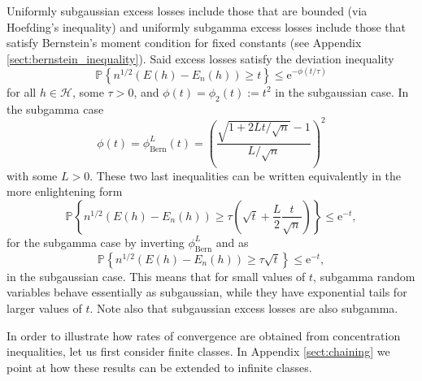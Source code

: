 \documentclass{uvamath}
\newcommand*{\calH}{\mathcal{H}}
\newcommand*{\prob}[2][]{\mathbb{P}_{#1}\left\{#2\right\}}
\newcommand*{\paren}[1]{\left(#1\right)}
\newcommand*{\rme}{\mathrm{e}}
\theoremstyle{remark}
\theoremstyle{definition}
\theoremstyle{definition}
\theoremstyle{definition}
\theoremstyle{definition}
\theoremstyle{definition}
\begin{document}
Uniformly subgaussian excess losses include those that are bounded
(via Hoefding's inequality) and uniformly subgamma excess losses
include those that satisfy Bernstein's moment condition for fixed
constants (see Appendix \ref{sect:bernstein_inequality}). Said excess
losses satisfy the deviation inequality
\begin{equation}\label{eq:pac_considered}
  \prob{n^{1/2}(E(h) - E_n(h))\geq t}\leq \rme^{-\phi(t/\tau)}
\end{equation}
for all $h\in\calH$, some $\tau>0$, and $\phi(t) = \phi_2(t):= t^2$ in
the subgaussian case. In the subgamma case
$$\phi(t)= \phi_{\text{Bern}}^L(t) = \paren{\frac{\sqrt{1 +
      2Lt/\sqrt{n}} - 1}{L/\sqrt{n}}}^2$$
with some $L>0$. These two last inequalities can be written
equivalently in the more enlightening form
\begin{equation*}
  \prob{n^{1/2}(E(h) - E_n(h))\geq \tau\paren{\sqrt{t} +
    \frac{L}{2}\frac{t}{\sqrt{n}}}}\leq \rme^{-t},
\end{equation*}
for the subgamma case by inverting $\phi_{\text{Bern}}^L$ and as
\begin{equation*}
  \prob{n^{1/2}(E(h) - E_n(h))\geq \tau\sqrt{t}} \leq \rme^{-t},
\end{equation*}
in the subgaussian case. This means that for small values of $t$,
subgamma random variables behave essentially as subgaussian, while
they have exponential tails for larger values of $t$. Note also that
subgaussian excess losses are also subgamma.

In order to illustrate how rates of convergence are obtained from
concentration inequalities, let us first consider finite classes. In
Appendix \ref{sect:chaining} we point at how these results can be
extended to infinite classes.
\end{document}
